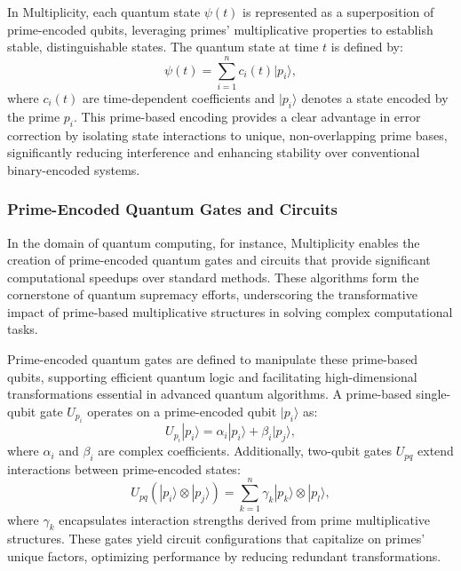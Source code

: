 \documentclass{article}
\newcommand{\primeQubit}[1]{|p_{#1}\rangle}
\newcommand{\primeGate}[1]{U_{p_{#1}}}
\begin{document}
In Multiplicity, each quantum state \( \psi(t) \) is represented as a superposition of prime-encoded qubits, leveraging primes’ multiplicative properties to establish stable, distinguishable states. The quantum state at time \( t \) is defined by:
\begin{equation}
    \psi(t) = \sum_{i=1}^{n} c_i(t) \primeQubit{i},
\end{equation}
where \( c_i(t) \) are time-dependent coefficients and \( \primeQubit{i} \) denotes a state encoded by the prime \( p_i \). This prime-based encoding provides a clear advantage in error correction by isolating state interactions to unique, non-overlapping prime bases, significantly reducing interference and enhancing stability over conventional binary-encoded systems.

\subsubsection{Prime-Encoded Quantum Gates and Circuits}
In the domain of quantum computing, for instance, Multiplicity enables the creation of prime-encoded quantum gates and circuits that provide significant computational speedups over standard methods. These algorithms form the cornerstone of quantum supremacy efforts, underscoring the transformative impact of prime-based multiplicative structures in solving complex computational tasks.

Prime-encoded quantum gates are defined to manipulate these prime-based qubits, supporting efficient quantum logic and facilitating high-dimensional transformations essential in advanced quantum algorithms. A prime-based single-qubit gate \( \primeGate{i} \) operates on a prime-encoded qubit \( \primeQubit{i} \) as:
\begin{equation}
    \primeGate{i} \primeQubit{i} = \alpha_i \primeQubit{i} + \beta_i \primeQubit{j},
\end{equation}
where \( \alpha_i \) and \( \beta_i \) are complex coefficients. Additionally, two-qubit gates \( U_{pq} \) extend interactions between prime-encoded states:
\begin{equation}
    U_{pq} \left( \primeQubit{i} \otimes \primeQubit{j} \right) = \sum_{k=1}^{n} \gamma_k \primeQubit{k} \otimes \primeQubit{l},
\end{equation}
where \( \gamma_k \) encapsulates interaction strengths derived from prime multiplicative structures. These gates yield circuit configurations that capitalize on primes’ unique factors, optimizing performance by reducing redundant transformations.
\end{document}
